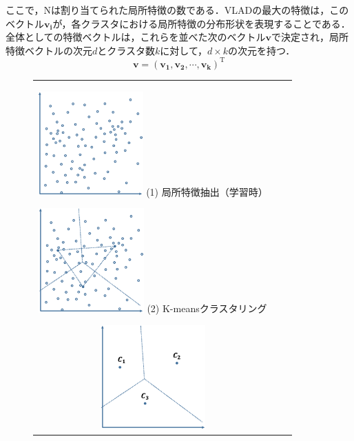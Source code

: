 ここで，Nは割り当てられた局所特徴の数である．VLADの最大の特徴は，このベクトル$ \bm{v_i} $が，各クラスタにおける局所特徴の分布形状を表現することである．全体としての特徴ベクトルは，これらを並べた次のベクトル$ \bm{v} $で決定され，局所特徴ベクトルの次元$ d $とクラスタ数$ k $に対して，$ d \times k $の次元を持つ．
\begin{equation}
{ \bm{v} = (\bm{v_1}, \bm{v_2}, \cdots, \bm{v_k})^{\mathrm{T}} }
\end{equation}
%
\begin{figure}[htbp]
\begin{tabular}{ccc}
%
 \begin{minipage}{0.33\textwidth}
  \begin{center}
   \includegraphics[height=40mm]{figure/vlad_1.eps}
   \hspace{1.6cm} (1) 局所特徴抽出（学習時）
  \end{center}
 \end{minipage}
%
 \begin{minipage}{0.33\textwidth}
  \begin{center}
   \includegraphics[height=40mm]{figure/vlad_2.eps}
   \hspace{1.6cm} (2) K-meansクラスタリング
  \end{center}
 \end{minipage}
%
 \begin{minipage}{0.33\textwidth}
  \begin{center}
   \includegraphics[height=40mm]{figure/vlad_3.eps}

\end{center}
\end{minipage}
\end{tabular}
\end{figure}

